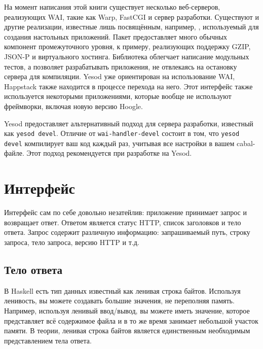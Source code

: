 На момент написания этой книги существует несколько веб-серверов, реализующих WAI, такие как Warp, FastCGI и
сервер разработки. Существуют и другие реализации, известные лишь посвящённым, например,
,
используемый для создания настольных приложений. Пакет  предоставляет много обычных компонент промежуточного уровня, к примеру, реализующих поддержку GZIP, JSON-P
и виртуального хостинга. Библиотека 
облегчает написание модульных тестов, а  позволяет разрабатывать приложения, не отвлекаясь на остановку сервера для компиляции.
Yesod уже ориентирован на использование WAI, Happstack также находится в процессе перехода на него.
Этот интерфейс также используется некоторыми приложениями, которые вообще не
используют фреймворки, включая новую версию Hoogle.

\begin{remark}
Yesod предоставляет альтернативный подход для сервера разработки, известный как
\texttt{yesod devel}. Отличие от \texttt{wai-handler-devel} состоит в том, что \texttt{yesod devel} компилирует
ваш код каждый раз, учитывая все настройки в вашем cabal-файле.
Этот подход рекомендуется при разработке на Yesod.
\end{remark}

\section {Интерфейс}
Интерфейс сам по себе довольно незатейлив: приложение принимает запрос и возвращает
ответ. Ответом является статус HTTP, список заголовков и тело ответа.
Запрос содержит различную информацию: запрашиваемый путь, строку запроса, тело запроса, версию HTTP и т.д.

\subsection {Тело ответа}
В Haskell есть тип данных известный как ленивая строка байтов. Используя ленивость,
вы можете создавать большие значения, не переполняя память. Например, используя ленивый ввод/вывод,
вы можете иметь значение, которое представляет всё
содержимое файла и в то же время занимает небольшой участок памяти. В теории,
ленивая строка байтов является единственным необходимым представлением тела ответа.


